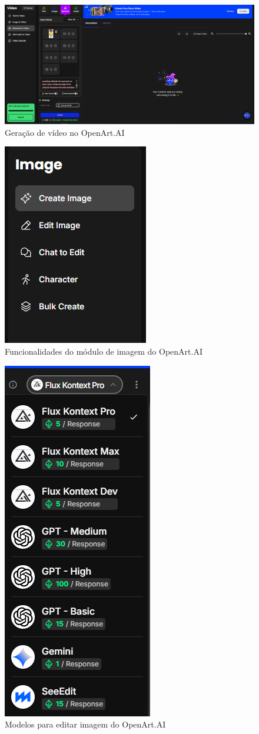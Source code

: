 \begin{figure}[htbp]
    \centering
    \caption{\small Geração de vídeo no OpenArt.AI}
    \label{fig:openArtVideo}
    \includegraphics[width=1\linewidth]{figs/OpenArtAI/telaVideo.PNG}
\end{figure}

\begin{figure}[htbp]
    \centering
    \caption{\small Funcionalidades do módulo de imagem do OpenArt.AI}
    \label{fig:openArtModuloImagem}
    \includegraphics[width=0.3\linewidth]{figs/OpenArtAI/telaImagemModulos.PNG}
\end{figure}

\begin{figure}[htbp]
    \centering
    \caption{\small Modelos para editar imagem do OpenArt.AI}
    \label{fig:openArtModelosImagem}
    \includegraphics[width=0.3\linewidth]{figs/OpenArtAI/opcoesModeloEdit.PNG}
\end{figure}

